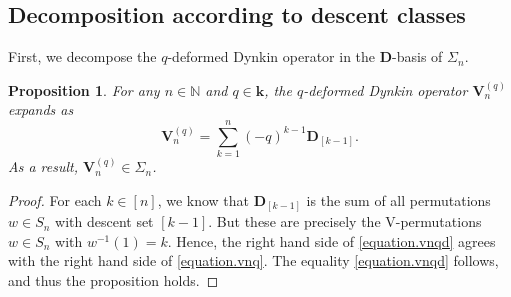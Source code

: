 \documentclass[revision]{FPSAC2025}
\newtheorem{defn}{Definition}
\newtheorem{proposition}{Proposition}
\newcommand{\w}{\omega}
\newcommand{\NN}{\mathbb{N}} %
\newcommand{\kk}{\mathbf{k}} %
\begin{document}
\subsection{Decomposition according to descent classes}
% 
First, we decompose the $q$-deformed Dynkin operator in the $\mathbf{D}$-basis of $\Sigma_n$.
\begin{proposition}
\label{proposition.vnqd}
For any $n \in \NN$ and $q \in \kk$, the $q$-deformed Dynkin operator $\mathbf{V}_{n}^{(q)}$ expands as
\begin{equation}
\label{equation.vnqd}
\mathbf{V}_{n}^{(q)} = \sum_{k=1}^n (-q)^{k-1} \mathbf{D}_{[k-1]}.
\end{equation}
As a result, $\mathbf{V}_{n}^{(q)} \in \Sigma_n$.
\end{proposition}
\begin{proof}
For each $k \in [n]$, we know that $\mathbf{D}_{\left[  k-1\right]  }$ is the sum of all permutations $w \in S_n$ with descent set $[k-1]$. But these are precisely the V-permutations $w \in S_n$ with $w^{-1}\left(1\right) = k$.
Hence, the right hand side of \eqref{equation.vnqd} agrees with the right hand side of \eqref{equation.vnq}.
The equality \eqref{equation.vnqd} follows, and thus the proposition holds.
\end{proof}
%
%
\end{document}
